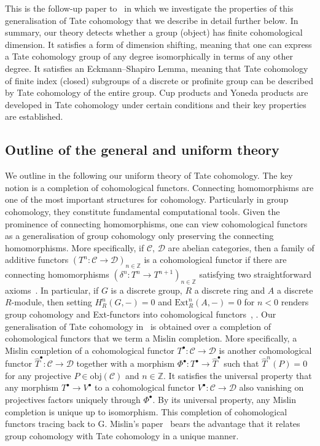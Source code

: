 \documentclass[12pt, a4paper]{article}
\numberwithin{equation}{section}
\theoremstyle{empty}
\theoremstyle{nonumberplain}
\begin{document}
This is the follow-up paper to~\cite{ghe24} in which we investigate the properties of this generalisation of Tate cohomology that we describe in detail further below. In summary, our theory detects whether a group (object) has finite cohomological dimension. It satisfies a form of dimension shifting, meaning that one can express a Tate cohomology group of any degree isomorphically in terms of any other degree. It satisfies an Eckmann–Shapiro Lemma, meaning that Tate cohomology of finite index (closed) subgroups of a discrete or profinite group can be described by Tate cohomology of the entire group. Cup products and Yoneda products are developed in Tate cohomology under certain conditions and their key properties are established.

\subsection{Outline of the general and uniform theory}\label{subsec:outline}

We outline in the following our uniform theory of Tate cohomology. The key notion is a completion of cohomological functors. Connecting homomorphisms are one of the most important structures for cohomology. Particularly in group cohomology, they constitute fundamental computational tools. Given the prominence of connecting homomorphisms, one can view cohomological functors as a generalisation of group cohomology only preserving the connecting homomorphisms. More specifically, if $\mathcal{C}$, $\mathcal{D}$ are abelian categories, then a family of additive functors $(T^n: \mathcal{C} \rightarrow \mathcal{D})_{n \in \mathbb{Z}}$ is a cohomological functor if there are connecting homomorphisms $(\delta^n: T^n \rightarrow T^{n+1})_{n \in \mathbb{Z}}$ satisfying two straightforward axioms~\cite[p.~201--202]{kro95}. In particular, if $G$ is a discrete group, $R$ a discrete ring and $A$ a  discrete $R$-module, then  setting $H_R^n(G, -) = 0$ and $\mathrm{Ext}_R^n(A,-) = 0$ for $n < 0$ renders group cohomology and Ext-functors into cohomological functors~\cite[p.~201]{kro95}, \cite[p.~295]{mis94}. Our generalisation of Tate cohomology in~\cite{ghe24} is obtained over a completion of cohomological functors that we term a Mislin completion. More specifically, a Mislin completion of a cohomological functor $T^{\bullet}: \mathcal{C} \rightarrow \mathcal{D}$ is another cohomological functor $\widehat{T}^{\bullet}: \mathcal{C} \rightarrow \mathcal{D}$ together with a morphism $\Phi^{\bullet}: T^{\bullet} \rightarrow \widehat{T}^{\bullet}$ such that $\widehat{T}^n(P) = 0$ for any projective $P \in \mathrm{obj}(\mathcal{C})$ and $n \in \mathbb{Z}$. It satisfies the universal property that any morphism $T^{\bullet} \rightarrow V^{\bullet}$ to a cohomological functor $V^{\bullet}: \mathcal{C} \rightarrow \mathcal{D}$ also vanishing on projectives factors uniquely through $\Phi^{\bullet}$. By its universal property, any Mislin completion is unique up to isomorphism. This completion of cohomological functors tracing back to G.\! Mislin's paper~\cite{mis94} bears the advantage that it relates group cohomology with Tate cohomology in a unique manner. \\
\end{document}
